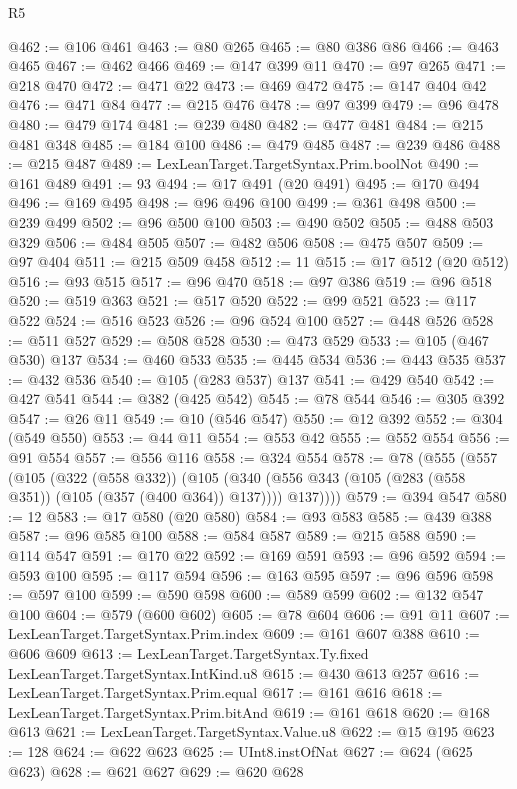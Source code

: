 \begin{lexlean}{R5}
\begin{coremodule}
@462 := @106 @461
@463 := @80 @265
@465 := @80 @386 @86
@466 := @463 @465
@467 := @462 @466
@469 := @147 @399 @11
@470 := @97 @265
@471 := @218 @470
@472 := @471 @22
@473 := @469 @472
@475 := @147 @404 @42
@476 := @471 @84
@477 := @215 @476
@478 := @97 @399
@479 := @96 @478
@480 := @479 @174
@481 := @239 @480
@482 := @477 @481
@484 := @215 @481 @348
@485 := @184 @100
@486 := @479 @485
@487 := @239 @486
@488 := @215 @487
@489 := LexLeanTarget.TargetSyntax.Prim.boolNot
@490 := @161 @489
@491 := 93
@494 := @17 @491 (@20 @491)
@495 := @170 @494
@496 := @169 @495
@498 := @96 @496 @100
@499 := @361 @498
@500 := @239 @499
@502 := @96 @500 @100
@503 := @490 @502
@505 := @488 @503 @329
@506 := @484 @505
@507 := @482 @506
@508 := @475 @507
@509 := @97 @404
@511 := @215 @509 @458
@512 := 11
@515 := @17 @512 (@20 @512)
@516 := @93 @515
@517 := @96 @470
@518 := @97 @386
@519 := @96 @518
@520 := @519 @363
@521 := @517 @520
@522 := @99 @521
@523 := @117 @522
@524 := @516 @523
@526 := @96 @524 @100
@527 := @448 @526
@528 := @511 @527
@529 := @508 @528
@530 := @473 @529
@533 := @105 (@467 @530) @137
@534 := @460 @533
@535 := @445 @534
@536 := @443 @535
@537 := @432 @536
@540 := @105 (@283 @537) @137
@541 := @429 @540
@542 := @427 @541
@544 := @382 (@425 @542)
@545 := @78 @544
@546 := @305 @392
@547 := @26 @11
@549 := @10 (@546 @547)
@550 := @12 @392
@552 := @304 (@549 @550)
@553 := @44 @11
@554 := @553 @42
@555 := @552 @554
@556 := @91 @554
@557 := @556 @116
@558 := @324 @554
@578 := @78
    (@555
      (@557
        (@105
          (@322 (@558 @332))
          (@105 (@340 (@556 @343 (@105 (@283 (@558 @351)) (@105 (@357 (@400 @364)) @137)))) @137))))
@579 := @394 @547
@580 := 12
@583 := @17 @580 (@20 @580)
@584 := @93 @583
@585 := @439 @388
@587 := @96 @585 @100
@588 := @584 @587
@589 := @215 @588
@590 := @114 @547
@591 := @170 @22
@592 := @169 @591
@593 := @96 @592
@594 := @593 @100
@595 := @117 @594
@596 := @163 @595
@597 := @96 @596
@598 := @597 @100
@599 := @590 @598
@600 := @589 @599
@602 := @132 @547 @100
@604 := @579 (@600 @602)
@605 := @78 @604
@606 := @91 @11
@607 := LexLeanTarget.TargetSyntax.Prim.index
@609 := @161 @607 @388
@610 := @606 @609
@613 := LexLeanTarget.TargetSyntax.Ty.fixed LexLeanTarget.TargetSyntax.IntKind.u8
@615 := @430 @613 @257
@616 := LexLeanTarget.TargetSyntax.Prim.equal
@617 := @161 @616
@618 := LexLeanTarget.TargetSyntax.Prim.bitAnd
@619 := @161 @618
@620 := @168 @613
@621 := LexLeanTarget.TargetSyntax.Value.u8
@622 := @15 @195
@623 := 128
@624 := @622 @623
@625 := UInt8.instOfNat
@627 := @624 (@625 @623)
@628 := @621 @627
@629 := @620 @628

\end{coremodule}
\end{lexlean}
